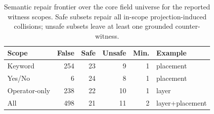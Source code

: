 \begin{table}[t]
\centering
\caption{Semantic repair frontier over the core field universe for the reported witness scopes. Safe subsets repair all in-scope projection-induced collisions; unsafe subsets leave at least one grounded counter-witness.}
\label{tab:semantic-frontier}
\footnotesize
\setlength{\tabcolsep}{3pt}
\begin{tabular}{@{}lrrrrl@{}}
\toprule
Scope & False & Safe & Unsafe & Min. & Example \\
\midrule
Keyword & 254 & 23 & 9 & 1 & placement \\
Yes/No & 6 & 24 & 8 & 1 & placement \\
Operator-only & 238 & 22 & 10 & 1 & layer \\
All & 498 & 21 & 11 & 2 & layer+placement \\
\bottomrule
\end{tabular}
\end{table}
